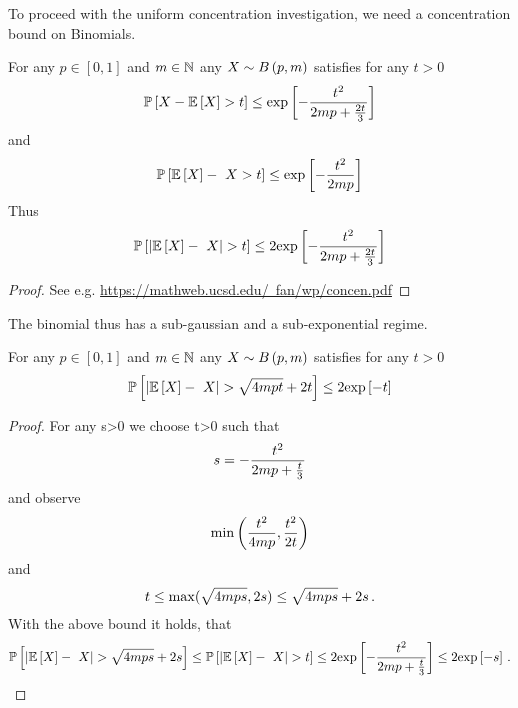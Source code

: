 To proceed with the uniform concentration investigation, we need a concentration bound on Binomials.

\begin{theorem}
	For any $p\in[0,1]$ and $m\in\mathbb{N}$ any $X \sim B\left(p,m\right)$ satisfies for any $t>0$
		\[ \mathbb{P}\left[X-\mathbb{E}\left[X\right] > t\right]  \leq \mathrm{exp}\left[- \frac{t^2}{2m p + \frac{2t}{3}} \right] \]
	and
		\[ \probat{\expectationof{X} - X > t}  \leq \expof{- \frac{t^2}{2\datanum p}} \]
	Thus
		\[ \probat{|\expectationof{X} - X| > t} \leq  2 \expof{- \frac{t^2}{2\datanum p + \frac{2t}{3}} }  \]
\end{theorem}
\begin{proof}
	See e.g.
	\href{https://mathweb.ucsd.edu/~fan/wp/concen.pdf}{https://mathweb.ucsd.edu/~fan/wp/concen.pdf}
\end{proof}

The binomial thus has a sub-gaussian and a sub-exponential regime.

\begin{theorem}
	For any $p\in[0,1]$ and $m\in\mathbb{N}$ any $X \sim B\left(p,m\right)$ satisfies for any $t>0$
		\[ \probat{|\expectationof{X} - X| > \sqrt{4\datanum p t} + 2 t} \leq  2 \expof{- t }  \]
\end{theorem}
\begin{proof}
	For any s>0 we choose t>0 such that 
		\[ s = - \frac{t^2}{2m p + \frac{t}{3}}  \]
	and observe 
		\[ \min\left( \frac{t^2}{4m p},\frac{t^2}{2t} \right) \]
	and
		\[ t \leq \max(\sqrt{4m p s},2s) \leq  \sqrt{4m p s} + 2s \, . \]
	With the above bound it holds, that
		\[  \probat{|\expectationof{X} - X| >  \sqrt{4\datanum p s} + 2s}
		\leq \probat{|\expectationof{X} - X| > t}
		\leq 2 \expof{- \frac{t^2}{2\datanum p + \frac{t}{3}} } 
		\leq 2 \expof{-s} \, . \]
\end{proof}

